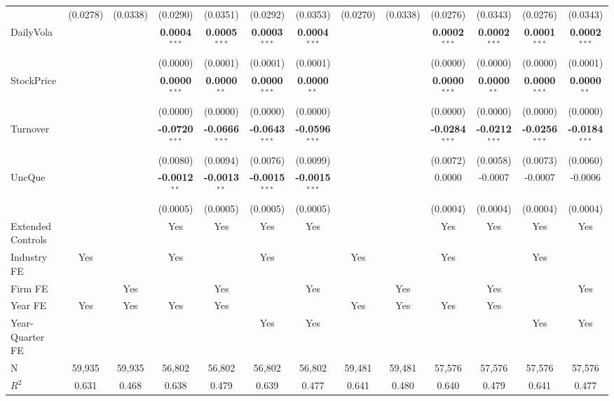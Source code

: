 \documentclass[11pt,a4paper]{article}
\begin{document}
\begin{table}[htbp]
\begin{tabular}{lcccccccccccc}
 & (0.0278) & (0.0338) & (0.0290) & (0.0351) & (0.0292) & (0.0353) & (0.0270) & (0.0338) & (0.0276) & (0.0343) & (0.0276) & (0.0343) \\
DailyVola &  &  & \textbf{0.0004}$^{***}$ & \textbf{0.0005}$^{***}$ & \textbf{0.0003}$^{***}$ & \textbf{0.0004}$^{***}$ &  &  & \textbf{0.0002}$^{***}$ & \textbf{0.0002}$^{***}$ & \textbf{0.0001}$^{***}$ & \textbf{0.0002}$^{***}$ \\
 &  &  & (0.0000) & (0.0001) & (0.0001) & (0.0001) &  &  & (0.0000) & (0.0000) & (0.0000) & (0.0001) \\
StockPrice &  &  & \textbf{0.0000}$^{***}$ & \textbf{0.0000}$^{**}$ & \textbf{0.0000}$^{***}$ & \textbf{0.0000}$^{**}$ &  &  & \textbf{0.0000}$^{***}$ & \textbf{0.0000}$^{**}$ & \textbf{0.0000}$^{***}$ & \textbf{0.0000}$^{**}$ \\
 &  &  & (0.0000) & (0.0000) & (0.0000) & (0.0000) &  &  & (0.0000) & (0.0000) & (0.0000) & (0.0000) \\
Turnover &  &  & \textbf{-0.0720}$^{***}$ & \textbf{-0.0666}$^{***}$ & \textbf{-0.0643}$^{***}$ & \textbf{-0.0596}$^{***}$ &  &  & \textbf{-0.0284}$^{***}$ & \textbf{-0.0212}$^{***}$ & \textbf{-0.0256}$^{***}$ & \textbf{-0.0184}$^{***}$ \\
 &  &  & (0.0080) & (0.0094) & (0.0076) & (0.0099) &  &  & (0.0072) & (0.0058) & (0.0073) & (0.0060) \\
UncQue &  &  & \textbf{-0.0012}$^{**}$ & \textbf{-0.0013}$^{**}$ & \textbf{-0.0015}$^{***}$ & \textbf{-0.0015}$^{***}$ &  &  & 0.0000 & -0.0007 & -0.0007 & -0.0006 \\
 &  &  & (0.0005) & (0.0005) & (0.0005) & (0.0005) &  &  & (0.0004) & (0.0004) & (0.0004) & (0.0004) \\
\midrule
Extended Controls &  &  & Yes & Yes & Yes & Yes &  &  & Yes & Yes & Yes & Yes \\
Industry FE & Yes &  & Yes &  & Yes &  & Yes &  & Yes &  & Yes &  \\
Firm FE &  & Yes &  & Yes &  & Yes &  & Yes &  & Yes &  & Yes \\
Year FE & Yes & Yes & Yes & Yes &  &  & Yes & Yes & Yes & Yes &  &  \\
Year-Quarter FE &  &  &  &  & Yes & Yes &  &  &  &  & Yes & Yes \\
\midrule
N & 59,935 & 59,935 & 56,802 & 56,802 & 56,802 & 56,802 & 59,481 & 59,481 & 57,576 & 57,576 & 57,576 & 57,576 \\
$R^2$ & 0.631 & 0.468 & 0.638 & 0.479 & 0.639 & 0.477 & 0.641 & 0.480 & 0.640 & 0.479 & 0.641 & 0.477 \\

\end{tabular}
\end{table}
\end{document}
